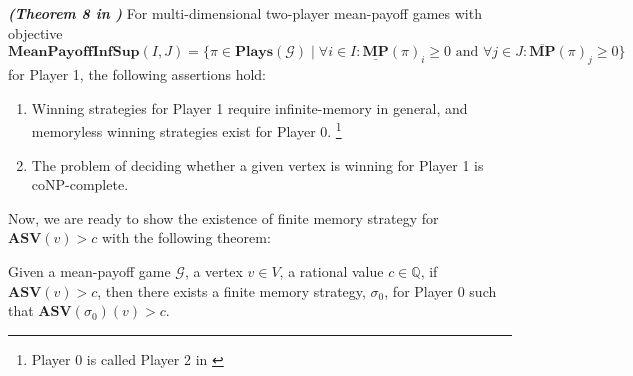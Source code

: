 \begin{theorem}
\label{ThmMemlessStrForP2NonEps}
\textbf{\emph{(Theorem 8 in \cite{VCDHRR15})}} For multi-dimensional two-player mean-payoff games with objective \\
$\mathbf{MeanPayoffInfSup}(I,J) = \{\pi \in \mathbf{Plays}(\mathcal{G}) \mid \forall i \in I : \underline{\mathbf{MP}}(\pi)_i \geqslant 0 \text{ and } \forall j \in J : \overline{\mathbf{MP}}(\pi)_j \geqslant 0\}$ for Player 1, the following assertions hold:
\begin{enumerate}
    \item Winning strategies for Player 1 require infinite-memory in general, and memoryless winning strategies exist for Player 0. \footnote{Player 0 is called Player 2 in \cite{VCDHRR15}}
    \item The problem of deciding whether a given vertex is winning for Player 1 is coNP-complete.
\end{enumerate}
\end{theorem}

Now, we are ready to show the existence of finite memory strategy for $\mathbf{ASV}(v) > c$ with the following theorem:

\begin{lemma}
\label{LemFinMemWitnessASVNonEps}
Given a mean-payoff game $\mathcal{G}$, a vertex $v \in V$, a rational value $c \in \mathbb{Q}$, if $\mathbf{ASV}(v) > c$, then there exists a finite memory strategy, $\sigma_0$, for Player 0 such that $\mathbf{ASV}(\sigma_0)(v) > c$.
\end{lemma}

